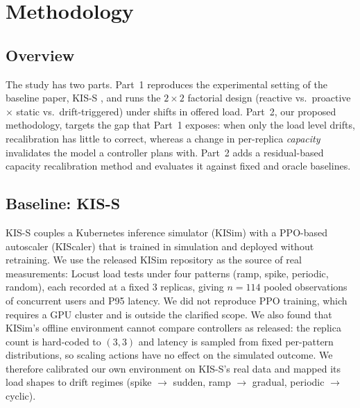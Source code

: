 
\section{Methodology}

\subsection{Overview}
The study has two parts. Part~1 reproduces the experimental setting of the baseline paper, KIS-S \cite{zhang2025kiss}, and runs the $2\times2$ factorial design (reactive vs.\ proactive $\times$ static vs.\ drift-triggered) under shifts in offered load. Part~2, our proposed methodology, targets the gap that Part~1 exposes: when only the load level drifts, recalibration has little to correct, whereas a change in per-replica \emph{capacity} invalidates the model a controller plans with. Part~2 adds a residual-based capacity recalibration method and evaluates it against fixed and oracle baselines.

\subsection{Baseline: KIS-S}
KIS-S \cite{zhang2025kiss} couples a Kubernetes inference simulator (KISim) with a PPO-based autoscaler (KIScaler) that is trained in simulation and deployed without retraining. We use the released KISim repository as the source of real measurements: Locust load tests under four patterns (ramp, spike, periodic, random), each recorded at a fixed 3 replicas, giving $n=114$ pooled observations of concurrent users and P95 latency. We did not reproduce PPO training, which requires a GPU cluster and is outside the clarified scope. We also found that KISim's offline environment cannot compare controllers as released: the replica count is hard-coded to $(3,3)$ and latency is sampled from fixed per-pattern distributions, so scaling actions have no effect on the simulated outcome. We therefore calibrated our own environment on KIS-S's real data and mapped its load shapes to drift regimes (spike $\rightarrow$ sudden, ramp $\rightarrow$ gradual, periodic $\rightarrow$ cyclic).

